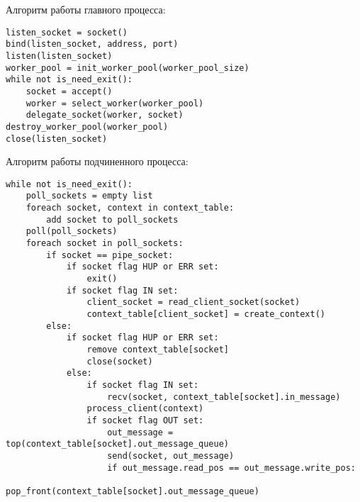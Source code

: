Алгоритм работы главного процесса:
\begin{verbatim}
listen_socket = soсket()
bind(listen_socket, address, port)
listen(listen_socket)
worker_pool = init_worker_pool(worker_pool_size)
while not is_need_exit():
    socket = accept()
    worker = select_worker(worker_pool)
    delegate_socket(worker, socket)
destroy_worker_pool(worker_pool)
close(listen_socket)
\end{verbatim}

Алгоритм работы подчиненного процесса:
\begin{verbatim}
while not is_need_exit():
    poll_sockets = empty list
    foreach socket, context in context_table:
        add socket to poll_sockets
    poll(poll_sockets)
    foreach socket in poll_sockets:
        if socket == pipe_socket:
            if socket flag HUP or ERR set:
                exit()
            if socket flag IN set:
                client_socket = read_client_socket(socket)
                context_table[client_socket] = create_context()
        else:
            if socket flag HUP or ERR set:
                remove context_table[socket]
                close(socket)
            else:
                if socket flag IN set:
                    recv(socket, context_table[socket].in_message)
                process_client(context)
                if socket flag OUT set:
                    out_message = top(context_table[socket].out_message_queue)
                    send(socket, out_message)
                    if out_message.read_pos == out_message.write_pos:
                        pop_front(context_table[socket].out_message_queue)
\end{verbatim}
